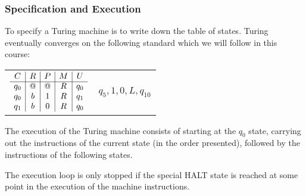 \documentclass{beamer}
\begin{document}
\begin{frame}
	\frametitle{Specification and Execution}

	To specify a Turing machine is to write down the table of states. Turing eventually converges on the following standard which we will follow in this course: 
	
	\vspace{0.3cm}

	\begin{center}
		\begin{tabular}{c c}

		
			$\begin{array}{ c | c | c | c | c }
				C & R & P & M & U \\
				\cline{1-5}
				q_{0} & @ & @ & R & q_{0} \\ 
				q_{0} & b & 1 & R & q_{1} \\
				q_{1} & b & 0 & R & q_{0}
			\end{array}$


			\hspace{1cm} 

			&

			$q_{5},1,0,L,q_{10}$

		\end{tabular}
	\end{center}

	The execution of the Turing machine consists of starting at the $q_{0}$ state, carrying out the instructions of the current state (in the order presented), followed by the instructions of the following states. 

	\vspace{0.5cm}

	The execution loop is only stopped if the special HALT state is reached at some point in the execution of the machine instructions. 
	
\end{frame}
\end{document}

